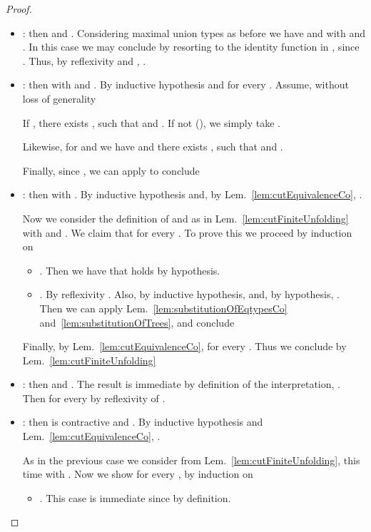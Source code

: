 \begin{proof}
\begin{itemize}
  \item : then  and . Considering maximal union types as
  before we have  and
   with  and . In this case we may conclude by resorting to
  the identity function in , since . Thus, by reflexivity
  and , .
  
  \item : then  with  and . By
  inductive hypothesis  and  for every . Assume, without loss of
  generality 

  If , there exists ,  such
  that  and . If not
  (\ie ), we simply take .
  
  Likewise, for  and  we have  and there exists , 
  such that  and .

  Finally, since , we can apply  to
  conclude 
  
  \item : then  with
  . By inductive hypothesis  and, by Lem.~\ref{lem:cutEquivalenceCo}, .
  
  Now we consider the definition of  and  as in
  Lem.~\ref{lem:cutFiniteUnfolding} with  and
  . We claim that  for every . To prove this we proceed by
  induction on 
  \begin{itemize}
    \item . Then we have  that holds by hypothesis.
    
    \item . By reflexivity
    . Also, by inductive
    hypothesis,  and,
    by hypothesis, . Then we can apply
    Lem.~\ref{lem:substitutionOfEqtypesCo} and~\ref{lem:substitutionOfTrees},
    and conclude 
  \end{itemize}
  
  Finally, by Lem.~\ref{lem:cutEquivalenceCo},  for every . Thus we
  conclude by Lem.~\ref{lem:cutFiniteUnfolding} 
  
  \item : then  and . The result is immediate by definition
  of the interpretation, . Then
   for every  by reflexivity of .
  
  \item : then  is contractive and . By inductive hypothesis and
  Lem.~\ref{lem:cutEquivalenceCo}, .
  
  As in the previous case we consider  from
  Lem.~\ref{lem:cutFiniteUnfolding}, this time with . Now we show  for every , by induction on 
  
  \begin{itemize}
    \item . This case is immediate since  by definition.
    

\end{itemize}
\end{itemize}
\end{proof}
